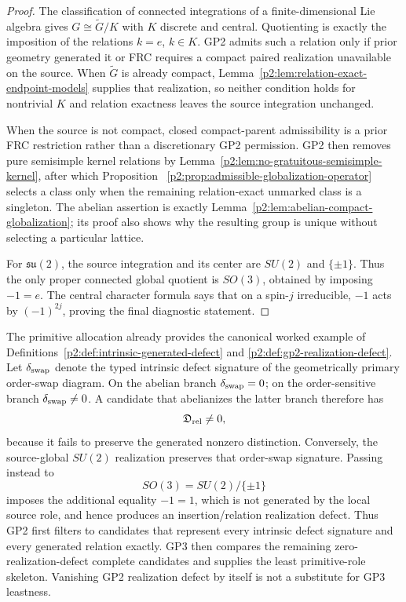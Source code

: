 \documentclass[12pt,a4paper]{article}
\begin{document}
\begin{proof}
The classification of connected integrations of a finite-dimensional Lie
algebra gives \(G\cong\widetilde G/K\) with \(K\) discrete and central.
Quotienting is exactly the imposition of the relations \(k=e\), \(k\in K\).
GP2 admits such a relation only if prior geometry generated it or FRC requires
a compact paired realization unavailable on the source.  When
\(\widetilde G\) is already compact, Lemma~\ref{p2:lem:relation-exact-endpoint-models}
supplies that realization, so neither condition holds for nontrivial \(K\)
and relation exactness leaves the source integration unchanged.

When the source is not compact, closed compact-parent admissibility is a prior
FRC restriction rather than a discretionary GP2 permission.  GP2 then removes
pure semisimple kernel relations by
Lemma~\ref{p2:lem:no-gratuitous-semisimple-kernel}, after which Proposition~
\ref{p2:prop:admissible-globalization-operator} selects a class only when the
remaining relation-exact unmarked class is a singleton.  The abelian assertion
is exactly Lemma~\ref{p2:lem:abelian-compact-globalization}; its proof also
shows why the resulting group is unique without selecting a particular
lattice.

For \(\mathfrak{su}(2)\), the source integration and its center are
\(SU(2)\) and \(\{\pm1\}\).  Thus the only proper connected global quotient
is \(SO(3)\), obtained by imposing \(-1=e\).  The central character formula
says that on a spin-\(j\) irreducible, \(-1\) acts by \((-1)^{2j}\), proving
the final diagnostic statement.
\end{proof}

\begin{remark}
\label{p2:rem:rank-one-defect-fidelity-example}
The primitive allocation already provides the canonical worked example of
Definitions~\ref{p2:def:intrinsic-generated-defect} and
\ref{p2:def:gp2-realization-defect}.  Let \(\delta_{\rm swap}\) denote the
typed intrinsic defect signature of the geometrically primary order-swap
diagram.  On the abelian branch \(\delta_{\rm swap}=0\); on the
order-sensitive branch \(\delta_{\rm swap}\ne0\).  A candidate that abelianizes
the latter branch therefore has
\[
 \mathfrak D_{\rm rel}\ne0,
\]
because it fails to preserve the generated nonzero distinction.  Conversely,
the source-global \(SU(2)\) realization preserves that order-swap signature.
Passing instead to
\[
 SO(3)=SU(2)/\{\pm1\}
\]
imposes the additional equality \(-1=1\), which is not generated by the local
source role, and hence produces an insertion/relation realization defect.
Thus GP2 first filters to candidates that represent every intrinsic defect
signature and every generated relation exactly.  GP3 then compares the
remaining zero-realization-defect complete candidates and supplies the least
primitive-role skeleton.  Vanishing GP2 realization defect by itself is not a
substitute for GP3 leastness.
\end{remark}
\end{document}
